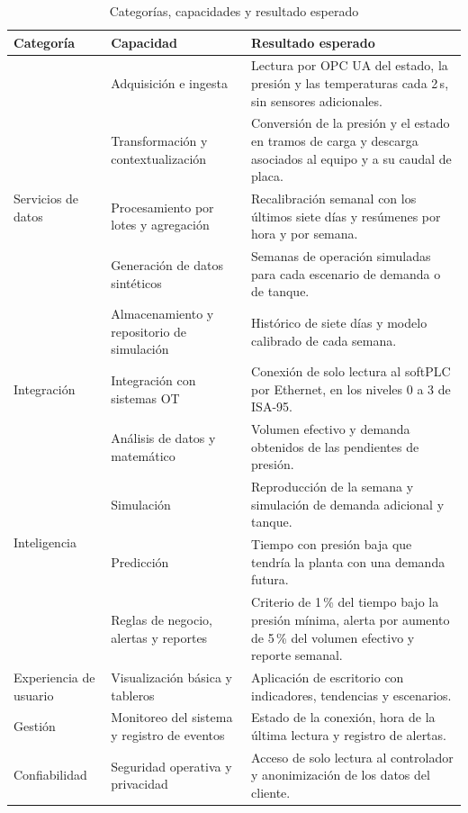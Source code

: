 \begin{table}[htbp]
\centering
\caption{Categorías, capacidades y resultado esperado}
\label{tab:capacidades}
\footnotesize
\renewcommand{\arraystretch}{1.2}
\begin{tabular}{|p{2.3cm}|p{3.6cm}|p{8.1cm}|}
\hline
\textbf{Categoría} & \textbf{Capacidad} & \textbf{Resultado esperado} \\ \hline
\multirow{5}{2.3cm}{Servicios de datos} & Adquisición e ingesta & Lectura por OPC UA del estado, la presión y las temperaturas cada 2\,s, sin sensores adicionales. \\ \cline{2-3}
 & Transformación y contextualización & Conversión de la presión y el estado en tramos de carga y descarga asociados al equipo y a su caudal de placa. \\ \cline{2-3}
 & Procesamiento por lotes y agregación & Recalibración semanal con los últimos siete días y resúmenes por hora y por semana. \\ \cline{2-3}
 & Generación de datos sintéticos & Semanas de operación simuladas para cada escenario de demanda o de tanque. \\ \cline{2-3}
 & Almacenamiento y repositorio de simulación & Histórico de siete días y modelo calibrado de cada semana. \\ \hline
Integración & Integración con sistemas OT & Conexión de solo lectura al softPLC por Ethernet, en los niveles 0 a 3 de ISA-95. \\ \hline
\multirow{4}{2.3cm}{Inteligencia} & Análisis de datos y matemático & Volumen efectivo y demanda obtenidos de las pendientes de presión. \\ \cline{2-3}
 & Simulación & Reproducción de la semana y simulación de demanda adicional y tanque. \\ \cline{2-3}
 & Predicción & Tiempo con presión baja que tendría la planta con una demanda futura. \\ \cline{2-3}
 & Reglas de negocio, alertas y reportes & Criterio de 1\,\% del tiempo bajo la presión mínima, alerta por aumento de 5\,\% del volumen efectivo y reporte semanal. \\ \hline
Experiencia de usuario & Visualización básica y tableros & Aplicación de escritorio con indicadores, tendencias y escenarios. \\ \hline
Gestión & Monitoreo del sistema y registro de eventos & Estado de la conexión, hora de la última lectura y registro de alertas. \\ \hline
Confiabilidad & Seguridad operativa y privacidad & Acceso de solo lectura al controlador y anonimización de los datos del cliente. \\ \hline
\end{tabular}
\end{table}


